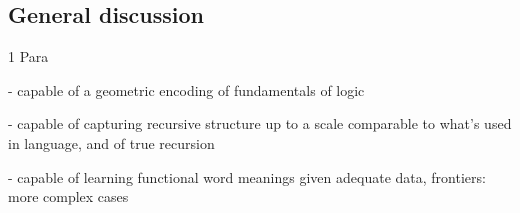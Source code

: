 \subsection{General discussion}  %

1 Para

- capable of a geometric encoding of fundamentals of logic 

- capable of capturing recursive structure up to a scale comparable to what's used in language, and of true recursion

- capable of learning functional word meanings given adequate data, frontiers: more complex cases

